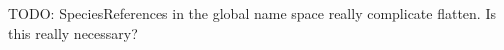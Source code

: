 TODO: SpeciesReferences in the global name space really complicate flatten.  Is this really necessary?

%
%
%
%
%
%
%
%
%    
%       
%
%
%
%
